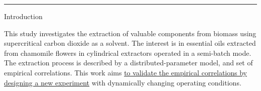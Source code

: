 \documentclass[a0,portrait]{a0poster}
\begin{document}
\noindent\rule{\textwidth}{3pt}


\begin{multicols}{2} %







\begin{tcolorbox}[width=\linewidth, boxrule=0mm, sharp corners=all, colback=white]
	{\LARGE Introduction\\}

This study investigates the extraction of valuable components from biomass using supercritical carbon dioxide as a solvent. The interest is in essential oils extracted from chamomile flowers in cylindrical extractors operated in a semi-batch mode. The extraction process is described by a distributed-parameter model, and set of empirical correlations. This work aims \underline{to validate the empirical correlations by designing a new experiment} with dynamically changing operating conditions. %
\end{tcolorbox}



\end{multicols}
\end{document}
